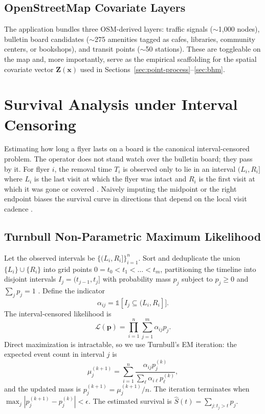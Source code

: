 \documentclass[sigconf,nonacm]{acmart}
\begin{document}
\subsection{OpenStreetMap Covariate Layers}

The application bundles three OSM-derived layers: traffic signals ($\sim$1{,}000 nodes), bulletin board candidates ($\sim$275 amenities tagged as cafes, libraries, community centers, or bookshops), and transit points ($\sim$50 stations). These are toggleable on the map and, more importantly, serve as the empirical scaffolding for the spatial covariate vector $\mathbf{Z}(\mathbf{x})$ used in Sections~\ref{sec:point-process}--\ref{sec:bhm}.

\section{Survival Analysis under Interval Censoring}
\label{sec:survival}

Estimating how long a flyer lasts on a board is the canonical interval-censored problem. The operator does not stand watch over the bulletin board; they pass by it. For flyer $i$, the removal time $T_i$ is observed only to lie in an interval $(L_i, R_i]$ where $L_i$ is the last visit at which the flyer was intact and $R_i$ is the first visit at which it was gone or covered \cite{turnbull, robust-survival}. Naively imputing the midpoint or the right endpoint biases the survival curve in directions that depend on the local visit cadence \cite{kpke}.

\subsection{Turnbull Non-Parametric Maximum Likelihood}

Let the observed intervals be $\{(L_i, R_i]\}_{i=1}^n$. Sort and deduplicate the union $\{L_i\} \cup \{R_i\}$ into grid points $0 = t_0 < t_1 < \dots < t_m$, partitioning the timeline into disjoint intervals $I_j = (t_{j-1}, t_j]$ with probability mass $p_j$ subject to $p_j \geq 0$ and $\sum_j p_j = 1$ \cite{gte}. Define the indicator
\begin{equation}
    \alpha_{ij} = \mathbb{1}[I_j \subseteq (L_i, R_i]].
\end{equation}
The interval-censored likelihood is
\begin{equation}
    \mathcal{L}(\mathbf{p}) = \prod_{i=1}^n \sum_{j=1}^m \alpha_{ij} p_j.
\end{equation}
Direct maximization is intractable, so we use Turnbull's EM iteration: the expected event count in interval $j$ is
\begin{equation}
    \mu_j^{(k+1)} = \sum_{i=1}^n \frac{\alpha_{ij} p_j^{(k)}}{\sum_{\ell} \alpha_{i\ell} p_\ell^{(k)}},
\end{equation}
and the updated mass is $p_j^{(k+1)} = \mu_j^{(k+1)} / n$. The iteration terminates when $\max_j |p_j^{(k+1)} - p_j^{(k)}| < \epsilon$. The estimated survival is $\hat{S}(t) = \sum_{j : t_j > t} p_j$.
\end{document}
